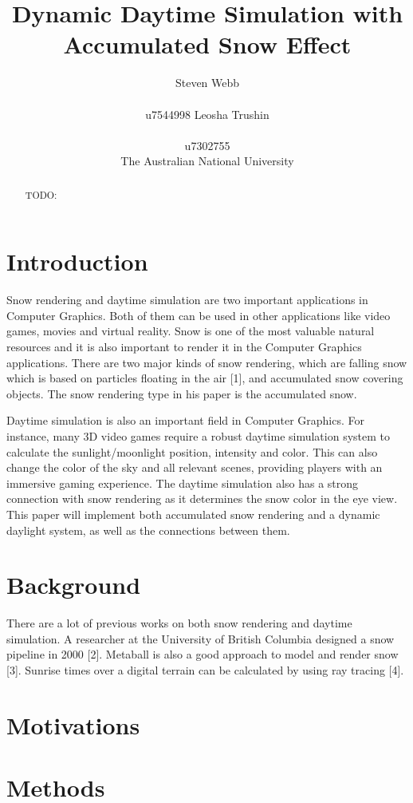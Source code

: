 \documentclass{article}
\title{Dynamic Daytime Simulation with Accumulated Snow Effect}
\author{%
  Steven Webb\\\\
  u7544998 
   \And
  Leosha Trushin\\\\
  u7302755\\
  \AND  The Australian National University 
}
\begin{document}
\maketitle

\begin{abstract}
TODO:
\end{abstract}

\section{Introduction}
Snow rendering and daytime simulation are two important applications in Computer Graphics. Both of them can be used in other 
applications like video games, movies and virtual reality. Snow is one of the most valuable natural resources and it is also
important to render it in the Computer Graphics applications. There are two major kinds of snow rendering, which are falling snow 
which is based on particles floating in the air [1], and accumulated snow covering objects. The snow rendering type in his paper 
is the accumulated snow.

Daytime simulation is also an important field in Computer Graphics. For instance, many 3D video games require a robust daytime 
simulation system to calculate the sunlight/moonlight position, intensity and color. This can also change the color of the sky and all  
relevant scenes, providing players with an immersive gaming experience. The daytime simulation also has a strong connection with snow 
rendering as it determines the snow color in the eye view. This paper will implement both accumulated snow rendering and a dynamic
daylight system, as well as the connections between them.

\section{Background}
There are a lot of previous works on both snow rendering and daytime simulation. A researcher at the University of British Columbia
designed a snow pipeline in 2000 [2]. Metaball is also a good approach to model and render snow [3]. Sunrise times over a digital 
terrain can be calculated by using ray tracing [4].

\section{Motivations}

\section {Methods}
\end{document}
